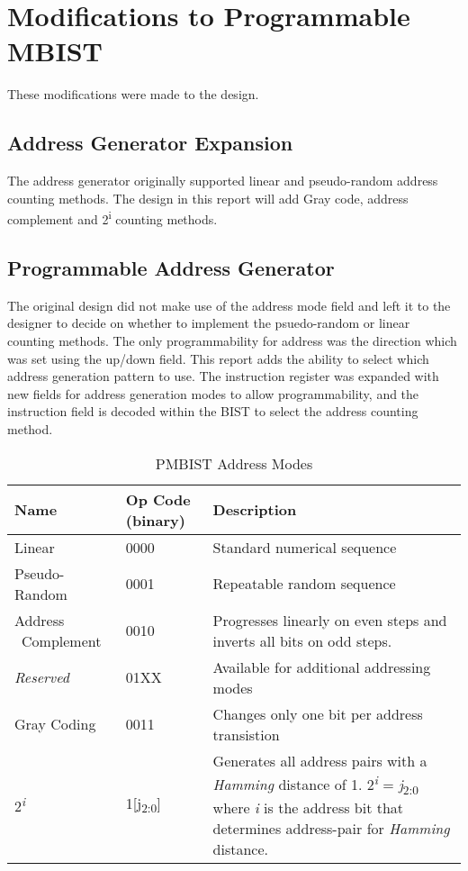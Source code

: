 \section{Modifications to Programmable MBIST}
\label{sect:bg-modifications}
These modifications were made to the design.

\subsection{Address Generator Expansion}
The address generator originally supported linear and pseudo-random address counting methods.  The design in this report will add Gray code, address complement and 2\textsuperscript{i} counting methods.

\subsection{Programmable Address Generator}
The original design did not make use of the address mode field and left it to the designer to decide on whether to implement the psuedo-random or linear counting methods.  The only programmability for address was the direction which was set using the up/down field.  This report adds the ability to select which address generation pattern to use.  The instruction register was expanded with new fields for address generation modes to allow programmability, and the instruction field is decoded within the BIST to select the address counting method.

\begin{table}[hbt]
  \caption{PMBIST Address Modes}
  \centering
 \begin{tabular}{|p{1in}|p{0.75in}|p{3in}|}
  \hline
  Name & Op Code (binary) & Description \\ [0.5ex]
  \hline\hline
  Linear              & 0000 & Standard numerical sequence  \\ 
  \hline
  Pseudo-Random       & 0001 & Repeatable random sequence \\ 
  \hline
  Address \ Complement  & 0010 & Progresses linearly on even steps and inverts all bits on odd steps.\\ 
  \hline
  \textit{Reserved}            & 01XX & Available for additional addressing modes \\ 
  \hline
  Gray Coding         & 0011 & Changes only one bit per address transistion \\ 
  \hline
  2\textsuperscript{\textit{i}}& 1[j\textsubscript{2:0}] & Generates all address pairs with a \textit{Hamming} distance of 1.  2\textsuperscript{\textit{i}} = \textit{j}\textsubscript{2:0} where \textit{i} is the address bit that determines address-pair for \textit{Hamming} distance. \\ 
  \hline
 \end{tabular}
\label{tab:addrmode}
\end{table}

